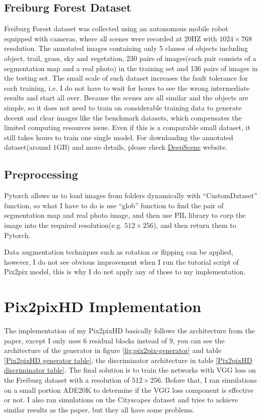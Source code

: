 \subsection{Freiburg Forest Dataset}
\label{sec:freiburg}
Freiburg Forest dataset\cite{valada16iser} was collected using an autonomous mobile robot equipped with 
cameras, where all scenes were recorded at 20HZ with $1024\times768$ resolution. The 
annotated images containing only 5 classes of objects including object, trail, grass, sky 
and vegetation, 230 pairs of images(each pair consists of a segmentation
map and a real photo) in the training set and 136 pairs of images in the testing set. 
The small scale of such dataset increases the fault tolerance for each training, i.e. I do 
not have to wait for hours to see the wrong intermediate results and start all over. 
Because the scenes are all similar and the objects are simple, so it does not need to train
on considerable training data to generate decent and clear images like the benchmark datasets,
which compensates the limited computing resources issue.
Even if this is a comparable small dataset, it still takes hours to train one single model. 
For downloading the annotated dataset(around 1GB) and more details, please 
check \href{http://deepscene.cs.uni-freiburg.de}{DeepScene} website.
\subsection{Preprocessing}
Pytorch allows us to load images from folders dynamically with “CustomDataset” function, so 
what I have to do is use “glob” function to find the pair of segmentation map and real photo 
image, and then use PIL library to corp the image into the required resolution(e.g. $512\times256$), 
and then return them to Pytorch.

Data augmentation techniques such as rotation or flipping can be applied, however, 
I do not see obvious improvement when I run the tutorial script of Pix2pix model, 
this is why I do not apply any of those to my implementation.

\section{Pix2pixHD Implementation}
The implementation of my Pix2pixHD basically follows the architecture from the paper, 
except I only uses 6 residual blocks instead of 9, you can see the architecture of the 
generator in figure \ref{fig:pix2pix-generator} and table \ref{Pix2pixHD generator table},  
the discriminator architecture in table \ref{Pix2pixHD discriminator table}. The final
solution is to train the networks with VGG loss on the Freiburg dataset with a
resolution of $512 \times 256$. Before that, 
I ran simulations on a small portion ADE20K to determine if the VGG loss component is 
effective or not. I also ran simulations on the Cityscapes dataset and tries to achieve similar 
results as the paper, but they all have some problems. 

